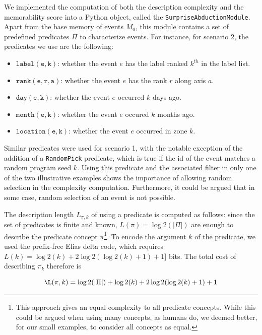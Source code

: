 \documentclass[entropy,article,submit,moreauthors,pdftex]{Definitions/mdpi}
\begin{document}
We implemented the computation of both the description complexity and the memorability score into a Python object, called the \texttt{SurpriseAbductionModule}. Apart from the base memory of events $M_0$, this module contains a set of predefined predicates $\Pi$ to characterize events. For instance, for scenario 2, the predicates we use are the following:
\begin{itemize}
    \item $\mathtt{label(e, k)}$: whether the event $e$ has the label ranked
          $k^{th}$ in the label list.
    \item $\mathtt{rank(e, r, a)}$: whether the event $e$ has the rank $r$
          along axis $a$.
    \item $\mathtt{day(e, k)}$: whether the event $e$ occurred $k$ days ago.
    \item $\mathtt{month(e, k)}$: whether the event $e$ occured $k$ months ago.
    \item $\mathtt{location(e, k)}$: whether the event $e$ occurred in zone
          $k$.
\end{itemize}

Similar predicates were used for scenario 1, with the notable exception of the addition of a \texttt{RandomPick} predicate, which is true if the id of the event matches a random program seed $k$. Using this predicate and the associated filter in only one of the two illustrative examples shows the importance of allowing random selection in the complexity computation. Furthermore, it could be argued that in some case, random selection of an event is not possible.

The description length $L_{\pi, k}$ of using a predicate is computed as follows: since the set of predicates is finite and known, $L(\pi) = \log2(|\Pi|)$ are enough to describe the predicate concept $\pi$\footnote{This approach gives an equal complexity to all predicate concepts. While this could be argued when using many concepts, as humans do, we deemed better, for our small examples, to consider all concepts as equal.}. To encode the argument $k$ of the predicate, we used the prefix-free Elias delta code\cite{elias_universal_1975}, which requires $L(k) = \log2(k) + 2 \log2(\log2(k)+1) + 1]$ bits. The total cost of describing $\pi_{k}$ therefore is

\begin{equation}
    \L(\pi, k) = \log2(|\Pi|) + \log2(k) + 2 \log2(\log2(k) + 1) + 1
\end{equation}
\end{document}

